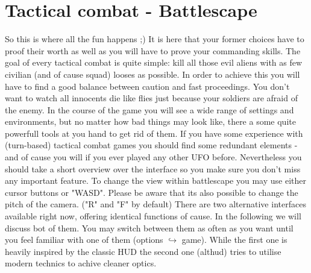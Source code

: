 
%
%


\section{Tactical combat - Battlescape}

So this is where all the fun happens ;) It is here that your former choices have to proof their worth as well as you will have to prove your commanding skills.
The goal of every tactical combat is quite simple: kill all those evil aliens with as few civilian (and of cause squad) looses as possible. In order to achieve this you will have to find a good balance between caution and fast proceedings. You don't want to watch all innocents die like flies just because your soldiers are afraid of the enemy.
In the course of the game you will see a wide range of settings and environments, but no matter how bad things may look like, there a some quite powerfull tools at you hand to get rid of them. If you have some experience with (turn-based) tactical combat games you should find some redundant elements - and of cause you will if you ever played any other UFO before. Nevertheless you should take a short overview over the interface so you make sure you don't miss any important feature. To change the view within battlescape you may use either cursor buttons or "WASD". Please be aware that its also possible to change the pitch of the camera. ("R" and "F" by default)
There are two alternative interfaces available right now, offering identical functions of cause. In the following we will discuss bot of them. You may switch between them as often as you want until you feel familiar with one of them (options $\hookrightarrow$ game).
While the first one is heavily inspired by the classic HUD the second one (althud) tries to utilise modern technics to achive cleaner optics.

